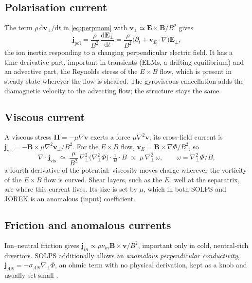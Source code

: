 \documentclass[11pt,a4paper]{article}
\newcommand{\bB}{\mathbf{B}}
\newcommand{\bE}{\mathbf{E}}
\newcommand{\bv}{\mathbf{v}}
\newcommand{\divg}{\nabla\!\cdot\!}
\newcommand{\jpol}{\mathbf{j}_{\mathrm{pol}}}
\newcommand{\jvis}{\mathbf{j}_{\mathrm{vis}}}
\newcommand{\vE}{\mathbf{v}_E}
\newcommand{\dd}{\mathrm{d}}
\begin{document}
\subsection{Polarisation current}
The term $\rho\,\dd\bv_\perp/\dd t$ in \eqref{eq:perpmom} with $\bv_\perp \simeq \bE\times\bB/B^2$ gives
\begin{equation}
  \jpol = \frac{\rho}{B^2}\,\frac{\dd\bE_\perp}{\dd t}
        = \frac{\rho}{B^2}\Big(\partial_t + \vE\cdot\nabla\Big)\bE_\perp ,
  \label{eq:jpol}
\end{equation}
the ion inertia responding to a changing perpendicular electric field. It has a time-derivative part, important in
transients (ELMs, a drifting equilibrium) and an advective part, the Reynolds stress of the $E\times B$ flow, which is
present in steady state wherever the flow is sheared. The gyroviscous cancellation adds the diamagnetic velocity to the
advecting flow; the structure stays the same.

\subsection{Viscous current}
A viscous stress $\mathbf{\Pi} = -\mu\nabla\bv$ exerts a force $\mu\nabla^2\bv$; its cross-field current is
$\jvis = -\bB\times\mu\nabla^2\bv_\perp/B^2$. For the $E\times B$ flow, $\bv_E = \bB\times\nabla\Phi/B^2$, so
\begin{equation}
  \divg\jvis \;\simeq\; \frac{\mu}{B^2}\,\nabla_\perp^2\big(\nabla_\perp^2\Phi\big)\cdot\tfrac{1}{B}\cdot B
  \;\propto\; \mu\,\nabla_\perp^2\,\omega,\qquad \omega = \nabla_\perp^2 \Phi/B ,
  \label{eq:jvis}
\end{equation}
a fourth derivative of the potential: viscosity moves charge wherever the vorticity of the $E\times B$ flow is curved.
Shear layers, such as the $E_r$ well at the separatrix, are where this current lives. Its size is set by $\mu$, which
in both SOLPS and JOREK is an anomalous (input) coefficient.

\subsection{Friction and anomalous currents}
Ion--neutral friction gives $\mathbf{j}_{in} \propto \rho\nu_{in}\bB\times\bv/B^2$, important only in cold, neutral-rich
divertors. SOLPS additionally allows an \emph{anomalous perpendicular conductivity},
$\mathbf{j}_{AN} = -\sigma_{AN}\nabla_\perp\Phi$, an ohmic term with no physical derivation, kept as a knob and usually
set small \cite{rozhansky2001}.
\end{document}
